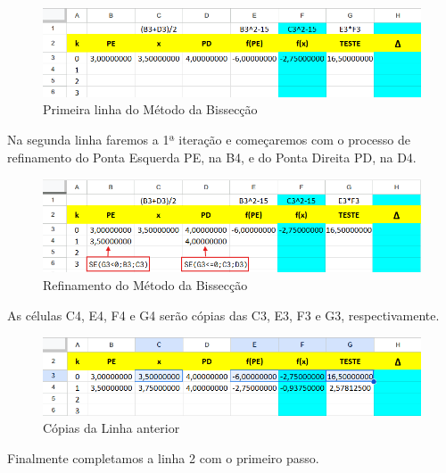 \documentclass[
  letterpaper,
  DIV=11,
  numbers=noendperiod]{scrreprt}
\begin{document}
\begin{figure}[H]

{\centering \includegraphics{CabBis1.png}

}

\caption{Primeira linha do Método da Bissecção}

\end{figure}%

Na segunda linha faremos a 1ª iteração e começaremos com o processo de
refinamento do Ponta Esquerda PE, na B4, e do Ponta Direita PD, na D4.

\begin{figure}[H]

{\centering \includegraphics{CabBis2.png}

}

\caption{Refinamento do Método da Bissecção}

\end{figure}%

As células C4, E4, F4 e G4 serão cópias das C3, E3, F3 e G3,
respectivamente.

\begin{figure}[H]

{\centering \includegraphics{CabBis2a.png}

}

\caption{Cópias da Linha anterior}

\end{figure}%

Finalmente completamos a linha 2 com o primeiro passo.
\end{document}
